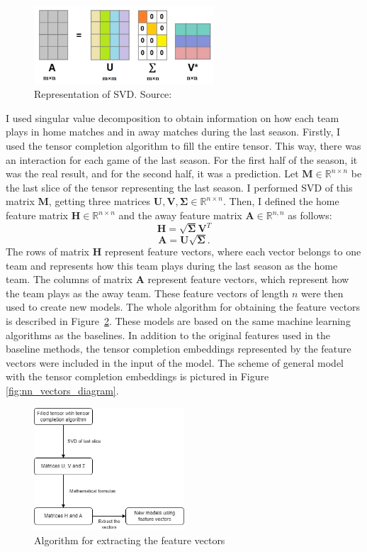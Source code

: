 \documentclass[thesis=M,english]{FITthesis}[2019/12/23]
\begin{document}
\begin{figure}[h]
    \centering
    \includegraphics[width=0.6\textwidth]{figures/svd.PNG}
    \caption{Representation of SVD. Source:~\cite{svd_pic}}
    \label{fig:svd}
\end{figure}

I used singular value decomposition to obtain information on how each team plays in home matches and in away matches during the last season. Firstly, I used the tensor completion algorithm to fill the entire tensor. This way, there was an interaction for each game of the last season. For the first half of the season, it was the real result, and for the second half, it was a prediction. Let $\boldsymbol{M} \in \mathbb{R}^{n \times n}$ be the last slice of the tensor representing the last season. I performed SVD of this matrix $\boldsymbol{M}$, getting three matrices $\boldsymbol{U}, \boldsymbol{V}, \boldsymbol{\Sigma} \in \mathbb{R}^{n \times n}$. Then, I defined the home feature matrix $\boldsymbol{H} \in \mathbb{R}^{n \times n}$ and the away feature matrix $\boldsymbol{A} \in \mathbb{R}^{n, n}$ as follows:
$$\boldsymbol{H} = \sqrt{\boldsymbol{\Sigma}} \boldsymbol{V}^T$$
$$\boldsymbol{A} = \boldsymbol{U} \sqrt{\boldsymbol{\Sigma}}.$$
The rows of matrix $\boldsymbol{H}$ represent feature vectors, where each vector belongs to one team and represents how this team plays during the last season as the home team. The columns of matrix $\boldsymbol{A}$ represent feature vectors, which represent how the team plays as the away team. These feature vectors of length $n$ were then used to create new models. The whole algorithm for obtaining the feature vectors is described in Figure~\ref{fig:svd_diagram}. These models are based on the same machine learning algorithms as the baselines. In addition to the original features used in the baseline methods, the tensor completion embeddings represented by the feature vectors were included in the input of the model. The scheme of general model with the tensor completion embeddings is pictured in Figure \ref{fig:nn_vectors_diagram}.

\begin{figure}[h]
    \centering
    \includegraphics[width=0.5\textwidth]{figures/svd_diagram.png}
    \caption{Algorithm for extracting the feature vectors}
    \label{fig:svd_diagram}
\end{figure} 
\end{document}
